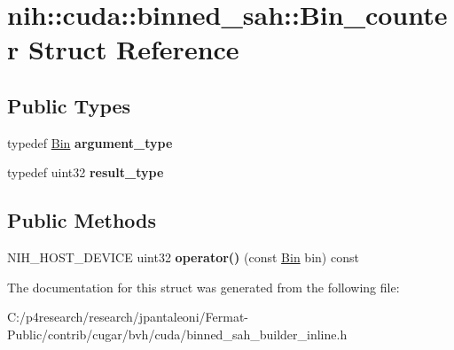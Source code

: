 \hypertarget{structnih_1_1cuda_1_1binned__sah_1_1_bin__counter}{}\section{nih\+:\+:cuda\+:\+:binned\+\_\+sah\+:\+:Bin\+\_\+counter Struct Reference}
\label{structnih_1_1cuda_1_1binned__sah_1_1_bin__counter}
\subsection*{Public Types}
\begin{DoxyCompactItemize}
\item 
\mbox{\label{structnih_1_1cuda_1_1binned__sah_1_1_bin__counter_a40af21540c22b22a6ea522a747e0fdda}} 
typedef \hyperlink{structnih_1_1cuda_1_1binned__sah_1_1_bin}{Bin} {\bfseries argument\+\_\+type}
\item 
\mbox{\label{structnih_1_1cuda_1_1binned__sah_1_1_bin__counter_ae59ba6322276be759d84f28c1e9a90d7}} 
typedef uint32 {\bfseries result\+\_\+type}
\end{DoxyCompactItemize}
\subsection*{Public Methods}
\begin{DoxyCompactItemize}
\item 
\mbox{\label{structnih_1_1cuda_1_1binned__sah_1_1_bin__counter_af16aa097ababc37a45cfacb479a5118d}} 
N\+I\+H\+\_\+\+H\+O\+S\+T\+\_\+\+D\+E\+V\+I\+CE uint32 {\bfseries operator()} (const \hyperlink{structnih_1_1cuda_1_1binned__sah_1_1_bin}{Bin} bin) const
\end{DoxyCompactItemize}


The documentation for this struct was generated from the following file\+:\begin{DoxyCompactItemize}
\item 
C\+:/p4research/research/jpantaleoni/\+Fermat-\/\+Public/contrib/cugar/bvh/cuda/binned\+\_\+sah\+\_\+builder\+\_\+inline.\+h\end{DoxyCompactItemize}
